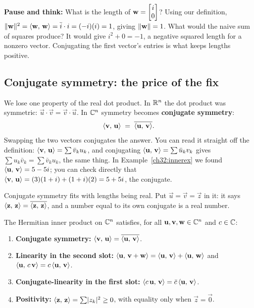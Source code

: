 \begin{recoverybox}
\textbf{Pause and think:} What is the length of $\mathbf{w} = \begin{bmatrix}i \\ 0\end{bmatrix}$?
Using our definition, $\lVert\mathbf{w}\rVert^2 = \langle \mathbf{w},\, \mathbf{w} \rangle = \bar i \cdot i = (-i)(i) = 1$, giving $\lVert\mathbf{w}\rVert = 1$.
What would the naive sum of squares produce? It would give $i^2 + 0 = -1$, a negative squared length for a nonzero vector.
Conjugating the first vector's entries is what keeps lengths positive.
\end{recoverybox}

\subsection{Conjugate symmetry: the price of the fix}

We lose one property of the real dot product.
In $\mathbb{R}^n$ the dot product was symmetric: $\vec u\cdot\vec v = \vec v\cdot\vec u$.
In $\mathbb{C}^n$ symmetry becomes \textbf{conjugate symmetry}:
\[
  \langle \mathbf{v},\, \mathbf{u} \rangle \;=\; \overline{\langle \mathbf{u},\, \mathbf{v} \rangle}.
\]
Swapping the two vectors conjugates the answer. You can read it straight off the
definition: $\langle \mathbf{v},\, \mathbf{u} \rangle = \sum\bar v_k u_k$, and conjugating
$\langle \mathbf{u},\, \mathbf{v} \rangle=\sum\bar u_kv_k$ gives $\sum u_k\bar v_k =
\sum\bar v_k u_k$, the same thing. In Example~\ref{ch32:innerex} we found
$\langle \mathbf{u},\, \mathbf{v} \rangle = 5-5i$; you can check directly that
$\langle \mathbf{v},\, \mathbf{u} \rangle = (3)(1+i)+(1+i)(2) = 5+5i$, the conjugate.

Conjugate symmetry fits with lengths being real. Put $\vec u=\vec v=\vec z$ in it:
it says $\langle \mathbf{z},\, \mathbf{z} \rangle = \overline{\langle \mathbf{z},\, \mathbf{z} \rangle}$, and a number
equal to its own conjugate is a real number.

\begin{formalbox}
The Hermitian inner product on $\mathbb{C}^n$ satisfies, for all $\mathbf{u},\mathbf{v},\mathbf{w}\in
\mathbb{C}^n$ and $c\in\mathbb{C}$:
\begin{enumerate}
  \item \textbf{Conjugate symmetry:} $\langle \mathbf{v},\, \mathbf{u} \rangle =
        \overline{\langle \mathbf{u},\, \mathbf{v} \rangle}$.
  \item \textbf{Linearity in the second slot:} $\langle \mathbf{u},\, \mathbf{v} + \mathbf{w} \rangle =
        \langle \mathbf{u},\, \mathbf{v} \rangle + \langle \mathbf{u},\, \mathbf{w} \rangle$ and
        $\langle \mathbf{u},\, c\,\mathbf{v} \rangle = c\,\langle \mathbf{u},\, \mathbf{v} \rangle$.
  \item \textbf{Conjugate-linearity in the first slot:}
        $\langle c\,\mathbf{u},\, \mathbf{v} \rangle = \bar c\,\langle \mathbf{u},\, \mathbf{v} \rangle$.
  \item \textbf{Positivity:} $\langle \mathbf{z},\, \mathbf{z} \rangle = \sum\lvert z_k\rvert^2 \ge 0$, with
        equality only when $\vec z = \vec 0$.
\end{enumerate}
\end{formalbox}

